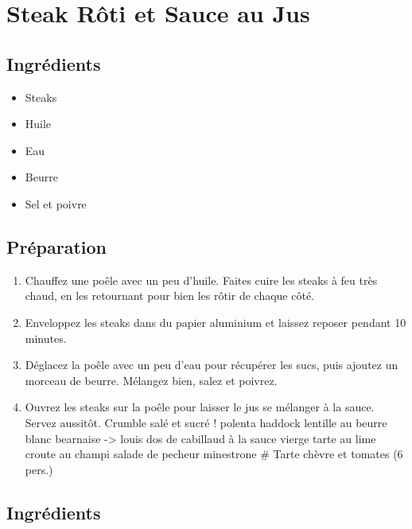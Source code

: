 \section{Steak Rôti et Sauce au
Jus}\label{steak-ruxf4ti-et-sauce-au-jus}

\subsection{Ingrédients}\label{ingruxe9dients-18}

\begin{itemize}

\item
  Steaks
\item
  Huile
\item
  Eau
\item
  Beurre
\item
  Sel et poivre
\end{itemize}

\subsection{Préparation}\label{pruxe9paration-5}

\begin{enumerate}
\def\labelenumi{\arabic{enumi}.}

\item
  Chauffez une poêle avec un peu d'huile. Faites cuire les steaks à feu
  très chaud, en les retournant pour bien les rôtir de chaque côté.
\item
  Enveloppez les steaks dans du papier aluminium et laissez reposer
  pendant 10 minutes.
\item
  Déglacez la poêle avec un peu d'eau pour récupérer les sucs, puis
  ajoutez un morceau de beurre. Mélangez bien, salez et poivrez.
\item
  Ouvrez les steaks sur la poêle pour laisser le jus se mélanger à la
  sauce. Servez aussitôt. Crumble salé et sucré ! polenta haddock
  lentille au beurre blanc bearnaise -\textgreater{} louis dos de
  cabillaud à la sauce vierge tarte au lime croute au champi salade de
  pecheur minestrone \# Tarte chèvre et tomates (6 pers.)
\end{enumerate}

\subsection{Ingrédients}\label{ingruxe9dients-19}

